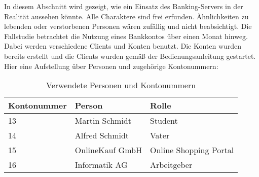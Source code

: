 In diesem Abschnitt wird gezeigt, wie ein Einsatz des Banking-Servers in der Realität aussehen könnte. Alle Charaktere sind frei erfunden. Ähnlichkeiten zu lebenden oder verstorbenen Personen wären zufällig und nicht beabsichtigt. Die Fallstudie betrachtet die Nutzung eines Bankkontos über einen Monat hinweg. Dabei werden verschiedene Clients und Konten benutzt. Die Konten wurden bereits erstellt und die Clients wurden gemäß der Bedienungsanleitung gestartet. Hier eine Aufstellung über Personen und zugehörige Kontonummern:

\begin{table}[h]
\caption{Verwendete Personen und Kontonummern}
\begin{center}

\begin{tabular}{p{3 cm}| p{3 cm}| p{3 cm}}
Kontonummer & Person & Rolle\\
				\hline
				\hline
13 & Martin Schmidt & Student\\ \hline

14 & Alfred Schmidt & Vater\\ \hline

15 & OnlineKauf GmbH & Online Shopping Portal\\ \hline

16 & Informatik AG & Arbeitgeber\\ \hline
\end{tabular}\\

\end{center}
\end{table}


